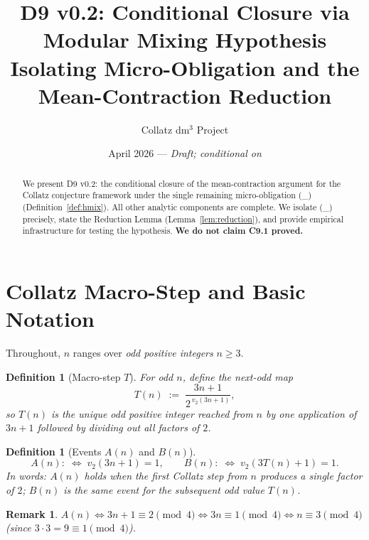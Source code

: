 \documentclass[11pt,a4paper]{article}
\title{\textbf{D9 v0.2}: Conditional Closure via Modular Mixing Hypothesis\\
       \large Isolating Micro-Obligation \Hmix{} and the Mean-Contraction Reduction}
\author{Collatz dm$^3$ Project}
\date{April 2026 — \emph{Draft; conditional on \Hmix{}}}
\newcommand{\vt}[1]{v_2\!\left(#1\right)}          %
\newcommand{\Hmix}{(\mathbf{H}_{\mathrm{mix}})}     %
\newtheorem{definition}[theorem]{Definition}
\newtheorem{remark}[theorem]{Remark}
\begin{document}
\maketitle

\begin{abstract}
We present D9 v0.2: the conditional closure of the mean-contraction argument for
the Collatz conjecture framework under the single remaining micro-obligation
\Hmix{} (Definition~\ref{def:hmix}).  All other analytic components are complete.
We isolate \Hmix{} precisely, state the Reduction Lemma (Lemma~\ref{lem:reduction}),
and provide empirical infrastructure for testing the hypothesis.
\textbf{We do not claim C9.1 proved.}
\end{abstract}

\tableofcontents
\newpage

\section{Collatz Macro-Step and Basic Notation}

Throughout, $n$ ranges over \emph{odd positive integers} $n \ge 3$.

\begin{definition}[Macro-step $T$]\label{def:macrostep}
For odd $n$, define the \emph{next-odd map}
\[
  T(n) \;:=\; \frac{3n+1}{2^{\,\vt{3n+1}}},
\]
so $T(n)$ is the unique odd positive integer reached from $n$ by one application
of $3n+1$ followed by dividing out all factors of $2$.
\end{definition}

\begin{definition}[Events $A(n)$ and $B(n)$]\label{def:events}
\[
  A(n) :\;\Longleftrightarrow\; \vt{3n+1} = 1, \qquad
  B(n) :\;\Longleftrightarrow\; \vt{3T(n)+1} = 1.
\]
In words: $A(n)$ holds when the first Collatz step from $n$ produces a single
factor of $2$; $B(n)$ is the same event for the \emph{subsequent} odd value
$T(n)$.
\end{definition}

\begin{remark}
$A(n) \Leftrightarrow 3n+1 \equiv 2 \pmod{4} \Leftrightarrow 3n \equiv 1 \pmod{4}
\Leftrightarrow n \equiv 3 \pmod{4}$ (since $3 \cdot 3 = 9 \equiv 1 \pmod{4}$).
\end{remark}

\end{document}
